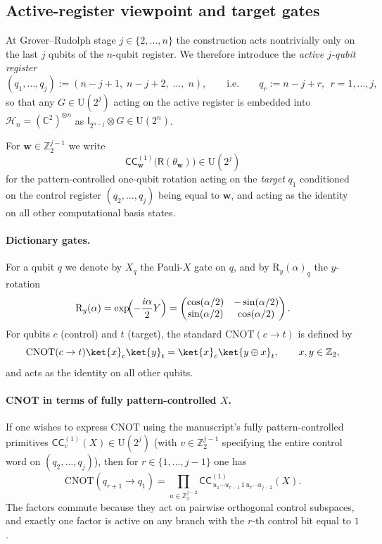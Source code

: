 \documentclass{article}
\newcommand{\CC}{\mathsf{C}\mathsf{C}}
\newcommand{\rI}{\mathsf{I}}
\newcommand{\rR}{\mathsf{R}}
\newcommand{\RY}{\mathrm{R}_y}
\newcommand{\CNOT}{\mathrm{CNOT}}
\numberwithin{equation}{section}
\begin{document}
\subsection{Active-register viewpoint and target gates}\label{subsec:transpilation_active}

At Grover--Rudolph stage $j\in\{2,\dots,n\}$ the construction acts nontrivially only on the last $j$ qubits of the
$n$-qubit register. We therefore introduce the \emph{active $j$-qubit register}
\[
(q_1,\dots,q_j):=(n-j+1,\;n-j+2,\;\dots,\;n),
\qquad\text{i.e.}\qquad q_r:=n-j+r,\ \ r=1,\dots,j,
\]
so that any $G\in\mathrm U(2^j)$ acting on the active register is embedded into $\mathcal H_n=(\mathbb C^2)^{\otimes n}$
as $\rI_{2^{n-j}}\otimes G\in\mathrm U(2^n)$.

For $\mathbf{w}\in\mathbb Z_2^{j-1}$ we write
\[
\CC_{\mathbf{w}}^{(1)}\bigl(\rR(\theta_{\mathbf{w}})\bigr)\in\mathrm U(2^j)
\]
for the pattern-controlled one-qubit rotation acting on the \emph{target} $q_1$ conditioned on the control register
$(q_2,\dots,q_j)$ being equal to $\mathbf{w}$, and acting as the identity on all other computational basis states.

\paragraph{Dictionary gates.}
For a qubit $q$ we denote by $X_q$ the Pauli-$X$ gate on $q$, and by $\RY(\alpha)_q$ the $y$-rotation
\[
\RY(\alpha)=\exp\!\Bigl(-\frac{i\alpha}{2}Y\Bigr)
=
\begin{pmatrix}
\cos(\alpha/2) & -\sin(\alpha/2)\\
\sin(\alpha/2) & \cos(\alpha/2)
\end{pmatrix}.
\]
For qubits $c$ (control) and $t$ (target), the standard $\CNOT(c\to t)$ is defined by
\[
\CNOT(c\to t)\ket{x}_c\ket{y}_t=\ket{x}_c\ket{y\oplus x}_t,
\qquad x,y\in\mathbb Z_2,
\]
and acts as the identity on all other qubits.

\paragraph{CNOT in terms of fully pattern-controlled $X$.}
If one wishes to express $\CNOT$ using the manuscript's fully pattern-controlled primitives
$\CC^{(1)}_{v}(X)\in\mathrm U(2^j)$ (with $v\in\mathbb Z_2^{j-1}$ specifying the entire control word on $(q_2,\dots,q_j)$),
then for $r\in\{1,\dots,j-1\}$ one has
\begin{equation}\label{eq:CNOT_as_product_of_CC}
\CNOT(q_{r+1}\to q_1)
=
\prod_{u\in\mathbb{Z}_2^{j-2}}
\CC^{(1)}_{\,u_1\cdots u_{r-1}\,1\,u_r\cdots u_{j-2}}(X).
\end{equation}
The factors commute because they act on pairwise orthogonal control subspaces, and exactly one factor is active on any
branch with the $r$-th control bit equal to $1$.
\end{document}
